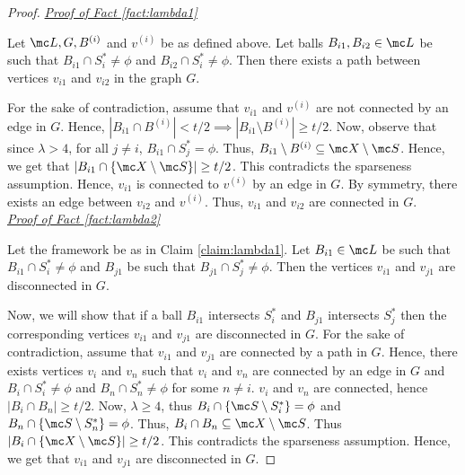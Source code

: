 \documentclass[11pt]{article}
\begin{document}
\begin{proof}
\noindent\textit{\underline{Proof of Fact \ref{fact:lambda1}}}
\begin{claim}
\label{claim:lambda1}
Let $\mc L, G, B^{(i)}$ and $v^{(i)}$ be as defined above. Let balls $B_{i1}, B_{i2} \in \mc L$ be such that $B_{i1} \cap S_i^* \neq \phi$ and $B_{i2} \cap S_i^* \neq \phi$. Then there exists a path between vertices $v_{i1}$ and $v_{i2}$ in the graph $G$.
\end{claim}
\vspace{-0.1in} For the sake of contradiction, assume that $v_{i1}$ and $v^{(i)}$ are not connected by an edge in $G$. Hence, $|B_{i1} \cap B^{(i)}| < t/2 \implies |B_{i1} \setminus B^{(i)}| \ge t/2$. Now, observe that since $\lambda > 4$, for all $j \neq i$, $B_{i1} \cap S_j^* = \phi$. Thus, $B_{i1} \setminus B^{(i)} \subseteq \mc X \setminus \mc S$. Hence, we get that $|B_{i1} \cap \{\mc X \setminus \mc S\}| \ge t/2$. This contradicts the sparseness assumption. Hence, $v_{i1}$ is connected to $v^{(i)}$ by an edge in $G$. By symmetry, there exists an edge between $v_{i2}$ and $v^{(i)}$. Thus, $v_{i1}$ and $v_{i2}$ are connected in $G$.\\

\noindent\textit{\underline{Proof of Fact \ref{fact:lambda2}}}
\begin{claim}
Let the framework be as in Claim \ref{claim:lambda1}. Let $B_{i1} \in \mc L$ be such that $B_{i1} \cap S_i^* \neq \phi$ and $B_{j1}$ be such that $B_{j1} \cap S_j^* \neq \phi$. Then the vertices $v_{i1}$ and $v_{j1}$ are disconnected in $G$.
\end{claim}
\vspace{-0.1in} Now, we will show that if a ball $B_{i1}$ intersects $S_i^*$ and $B_{j1}$ intersects $S_j^*$ then the corresponding vertices $v_{i1}$ and $v_{j1}$ are disconnected in $G$. For the sake of contradiction, assume that $v_{i1}$ and $v_{j1}$ are connected by a path in $G$. Hence, there exists vertices $v_{i}$ and $v_{n}$ such that $v_i$ and $v_n$ are connected by an edge in $G$ and $B_i \cap S_i^* \neq \phi$ and $B_n \cap S_n^* \neq \phi$ for some $n \neq i$. $v_i$ and $v_n$ are connected, hence $|B_i \cap B_n| \ge t/2$. Now, $\lambda \ge 4$, thus $B_i \cap \{\mc S \setminus S_i^*\} = \phi$ and $B_n \cap \{\mc S\setminus S_n^*\} = \phi$. Thus, $B_i \cap B_n \subseteq \mc X \setminus \mc S$. Thus $|B_{i} \cap \{\mc X \setminus \mc S\}| \ge t/2$. This contradicts the sparseness assumption. Hence, we get that $v_{i1}$ and $v_{j1}$ are disconnected in $G$.
\end{proof}
\end{document}
